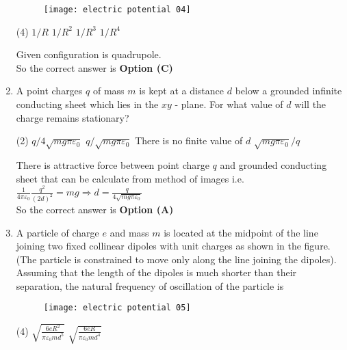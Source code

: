 \begin{enumerate}
	{}
	\begin{figure}[H]
		\centering
		\texttt{[image: electric potential 04]}
	\end{figure}
	\begin{tasks}(4)
		\task[\textbf{A.}] $1 / R$
		\task[\textbf{B.}] $1 / R^{2}$
		\task[\textbf{C.}] $1 / R^{3}$
		\task[\textbf{D.}] $1 / R^{4}$
	\end{tasks}
	\begin{answer}
		Given configuration is quadrupole.\\
		So the correct answer is \textbf{Option (C)}
	\end{answer}
	\item  A point charges $q$ of mass $m$ is kept at a distance $d$ below a grounded infinite conducting sheet which lies in the $x y$ - plane. For what value of $d$ will the charge remains stationary?
	{}
	\begin{tasks}(2)
		\task[\textbf{A.}] $q / 4 \sqrt{m g \pi \varepsilon_{0}}$
		\task[\textbf{B.}] $q / \sqrt{m g \pi \varepsilon_{0}}$
		\task[\textbf{C.}] There is no finite value of $d$
		\task[\textbf{D.}]  $\sqrt{m g \pi \varepsilon_{0}} / q$
	\end{tasks}
	\begin{answer}
		There is attractive force between point charge $q$ and grounded conducting sheet that can be calculate from method of images i.e. $\frac{1}{4 \pi \varepsilon_{0}} \frac{q^{2}}{(2 d)^{2}}=m g \Rightarrow d=\frac{q}{4 \sqrt{m g \pi \varepsilon_{0}}}$\\
		So the correct answer is \textbf{Option (A)}
	\end{answer}
	\item A particle of charge $e$ and mass $m$ is located at the midpoint of the line joining two fixed collinear dipoles with unit charges as shown in the figure. (The particle is constrained to move only along the line joining the dipoles). Assuming that the length of the dipoles is much shorter than their separation, the natural frequency of oscillation of the particle is
	{}
	\begin{figure}[H]
		\centering
		\texttt{[image: electric potential 05]}
	\end{figure}
	\begin{tasks}(4)
		\task[\textbf{A.}] $\sqrt{\frac{6 e R^{2}}{\pi \varepsilon_{0} m d^{5}}}$
		\task[\textbf{B.}] $\sqrt{\frac{6 e R}{\pi \varepsilon_{0} m d^{4}}}$

\end{tasks}
\end{enumerate}
